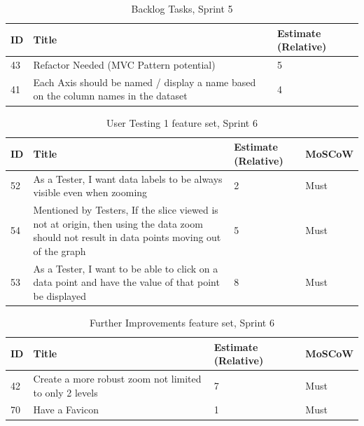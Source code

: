 \begin{table}[hbt!]
    \begin{tabularx}{\textwidth}{ | X | X | X | }
        \hline
        ID & Title                                                                               & Estimate (Relative) \\
        \hline
        43 & Refactor Needed (MVC Pattern potential)                                             & 5                   \\
        \hline
        41 & Each Axis should be named / display a name based on the column names in the dataset & 4                   \\
        \hline
    \end{tabularx}
    \caption{Backlog Tasks, Sprint 5}
    \label{sprint5}
\end{table}

\begin{table}[hbt!]
    \begin{tabularx}{\textwidth}{ | X | X | X | X | }
        \hline
        ID & Title                                                                                                                                         & Estimate (Relative) & MoSCoW \\
        \hline
        52 & As a Tester, I want data labels to be always visible even when zooming                                                                        & 2                   & Must   \\
        \hline
        54 & Mentioned by Testers, If the slice viewed is not at origin, then using the data zoom should not result in data points moving out of the graph & 5                   & Must   \\
        \hline
        53 & As a Tester, I want to be able to click on a data point and have the value of that point be displayed                                         & 8                   & Must   \\
        \hline
    \end{tabularx}
    \caption{User Testing 1 feature set, Sprint 6}
    \label{sprint6}
\end{table}

\begin{table}[hbt!]
    \begin{tabularx}{\textwidth}{ | X | X | X | X | }
        \hline
        ID & Title                                                  & Estimate (Relative) & MoSCoW \\
        \hline
        42 & Create a more robust zoom not limited to only 2 levels & 7                   & Must   \\
        \hline
        70 & Have a Favicon                                         & 1                   & Must   \\
        \hline
    \end{tabularx}
    \caption{Further Improvements feature set, Sprint 6}
    \label{sprint6-2}
\end{table}


